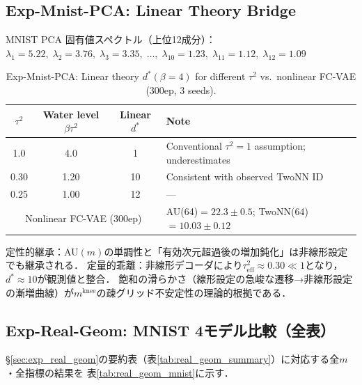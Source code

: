 \documentclass[11pt,a4paper]{jsarticle}
\newcommand{\mknee}{m^{\mathrm{knee}}}
\begin{document}
\subsection*{Exp-Mnist-PCA: Linear Theory Bridge}

MNIST PCA 固有値スペクトル（上位12成分）：
$\lambda_1=5.22,\; \lambda_2=3.76,\; \lambda_3=3.35,\;\ldots,\;\lambda_{10}=1.23,\; \lambda_{11}=1.12,\; \lambda_{12}=1.09$

\begin{table}[H]
\centering
\caption{Exp-Mnist-PCA: Linear theory $d^*(\beta=4)$ for different $\tau^2$ vs.\ nonlinear FC-VAE (300ep, 3 seeds).}
\label{tab:theory_pred}
\small
\begin{tabular}{ccc|l}
\toprule
$\tau^2$ & Water level $\beta\tau^2$ & Linear $d^*$ & Note \\
\midrule
1.0  & 4.0  & 1   & Conventional $\tau^2=1$ assumption; underestimates \\
0.30 & 1.20 & 10  & Consistent with observed TwoNN ID \\
0.25 & 1.00 & 12  & --- \\
\midrule
\multicolumn{3}{c|}{Nonlinear FC-VAE (300ep)} & AU(64)$=22.3\pm0.5$; TwoNN(64)$=10.03\pm0.12$ \\
\bottomrule
\end{tabular}
\end{table}

定性的継承：AU$(m)$の単調性と「有効次元超過後の増加鈍化」は非線形設定でも継承される．
定量的乖離：非線形デコーダにより$\tau^2_\mathrm{eff} \approx 0.30 \ll 1$となり，$d^* \approx 10$が観測値と整合．
飽和の滑らかさ（線形設定の急峻な遷移→非線形設定の漸増曲線）が$\mknee$の疎グリッド不安定性の理論的根拠である．

\subsection*{Exp-Real-Geom: MNIST 4モデル比較（全表）}

§\ref{sec:exp_real_geom}の要約表（表\ref{tab:real_geom_summary}）に対応する全$m$・全指標の結果を
表\ref{tab:real_geom_mnist}に示す．
\end{document}
